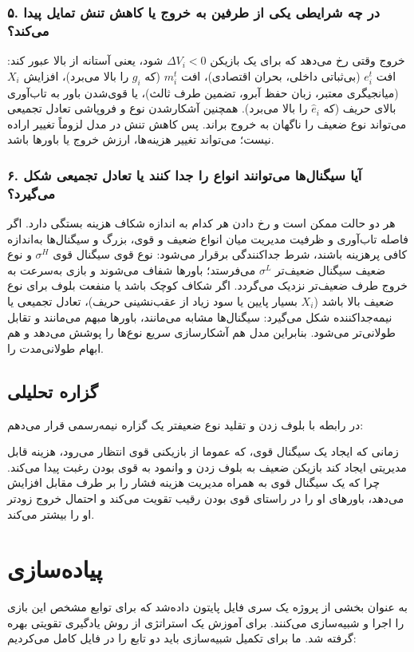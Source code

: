 \documentclass[12pt]{article}
\begin{document}
\subsubsection*{۵. در چه شرایطی یکی از طرفین به خروج یا کاهش تنش تمایل پیدا می‌کند؟}

خروج وقتی رخ می‌دهد که برای یک بازیکن $\Delta V_i < 0$ شود،
یعنی آستانه از بالا عبور کند: افت $e_i^t$ (بی‌ثباتی داخلی، بحران اقتصادی)،
افت $m_i^t$ (که $g_i$ را بالا می‌برد)، افزایش $X_i$ (میانجیگری معتبر، زبان حفظ آبرو،
تضمین طرف ثالث)، یا قوی‌شدن باور به تاب‌آوری بالای حریف (که $\hat e_i$ را بالا می‌برد).
همچنین آشکارشدن نوع و فروپاشی تعادل تجمیعی می‌تواند نوع ضعیف را ناگهان به خروج براند.
پس کاهش تنش در مدل لزوماً تغییر اراده نیست؛ می‌تواند تغییر هزینه‌ها، ارزش خروج یا باورها باشد.

\subsubsection*{۶. آیا سیگنال‌ها می‌توانند انواع را جدا کنند یا تعادل تجمیعی شکل می‌گیرد؟}

هر دو حالت ممکن است و رخ دادن هر کدام به اندازه شکاف هزینه بستگی دارد.
اگر فاصله تاب‌آوری و ظرفیت مدیریت میان انواع ضعیف و قوی، بزرگ و سیگنال‌ها به‌اندازه کافی پرهزینه باشند،
شرط جداکنندگی برقرار می‌شود: نوع قوی سیگنال قوی $\sigma^H$ 
و نوع ضعیف سیگنال ضعیف‌تر $\sigma^L$ می‌فرستد؛
باورها شفاف می‌شوند و بازی به‌سرعت به خروج طرف ضعیف‌تر نزدیک می‌گردد.
اگر شکاف کوچک باشد یا منفعت بلوف برای نوع ضعیف بالا باشد ($X_i$ بسیار پایین یا سود زیاد از عقب‌نشینی حریف)،
تعادل تجمیعی یا نیمه‌جداکننده شکل می‌گیرد: سیگنال‌ها مشابه می‌مانند، باورها مبهم می‌مانند
و تقابل طولانی‌تر می‌شود. بنابراین مدل هم آشکارسازی سریع نوع‌ها را پوشش می‌دهد و هم ابهام طولانی‌مدت را.

\subsection{گزاره تحلیلی}
در رابطه با بلوف زدن و تقلید نوع ضعیفتر یک گزاره نیمه‌رسمی قرار می‌دهم:

زمانی که ایجاد یک سیگنال قوی، که عموما از بازیکنی قوی انتظار می‌رود،
هزینه قابل مدیریتی ایجاد کند بازیکن ضعیف به بلوف زدن و وانمود به قوی بودن رغبت 
پیدا می‌کند. چرا که یک سیگنال قوی به همراه مدیریت هزینه فشار را بر
طرف مقابل افزایش می‌دهد، باورهای او را در راستای قوی بودن رقیب
تقویت می‌کند و احتمال خروج زودتر او را بیشتر می‌کند.


\section{پیاده‌سازی}
به عنوان بخشی از پروژه یک سری فایل پایتون داده‌شد که برای توابع مشخص این بازی
را اجرا و شبیه‌سازی می‌کنند. برای آموزش یک استراتژی از روش یادگیری تقویتی بهره گرفته شد.  ما برای تکمیل شبیه‌سازی باید 
دو تابع را در فایل
کامل می‌کردیم:
\end{document}
